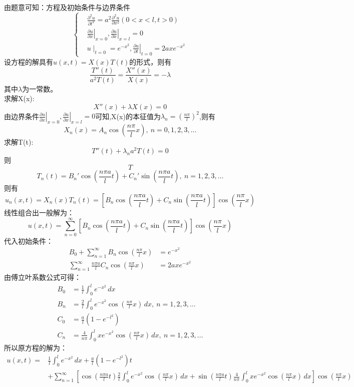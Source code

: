 \documentclass[10.5pt]{article}
\begin{document}
\section{}
由题意可知：方程及初始条件与边界条件$$\left\{\begin{aligned}
    &\frac{\partial^2 u}{\partial t^2}=a^2\frac{\partial^2u}{\partial x^2}(0<x<l,t>0)\\
    &\left.\frac{\partial u}{\partial x}\right\rvert_{x=0},\left.\frac{\partial u}{\partial x}\right\rvert_{x=l}=0\\
    &u\mid_{t=0}=e^{-x^2},\left.\frac{\partial u}{\partial t}\right\rvert_{t=0}=2axe^{-x^2}
\end{aligned}\right.$$\indent
设方程的解具有$u(x,t)=X(x)T(t)$的形式，则有$$\frac{T''(t)}{a^2T(t)}=\frac{X''(x)}{X(x)}=-\lambda$$\indent
其中$\lambda$为一常数。\\\indent
求解X(x):$$X''(x)+\lambda X(x)=0$$\indent
由边界条件$\left.\frac{\partial u}{\partial x}\right\rvert_{x=0},\left.\frac{\partial u}{\partial x}\right\rvert_{x=l}=0$可知,X(x)的本征值为$\lambda_n=\left(\frac{n\pi}{l}\right)^2$,则有$$X_n(x)=A_n\cos\left(\frac{n\pi}{l}x\right),~n=0,1,2,3,\dots$$\indent
求解T(t):$$T''(t)+\lambda_n a^2T(t)=0$$\indent
则$$T$$$$T_n(t)=B_n'\cos\left(\frac{n\pi a}{l}t\right)+C_n'\sin\left(\frac{n\pi a}{l}t\right),~n=1,2,3,\dots$$\indent
则有$$u_n(x,t)=X_n(x)T_n(t)=\left[B_n\cos\left(\frac{n\pi a}{l}t\right)+C_n\sin\left(\frac{n\pi a}{l}t\right)\right]\cos\left(\frac{n\pi}{l}x\right)$$\indent
线性组合出一般解为：$$u(x,t)=\sum_{n=0}^{\infty}\left[B_n\cos\left(\frac{n\pi a}{l}t\right)+C_n\sin\left(\frac{n\pi a}{l}t\right)\right]\cos\left(\frac{n\pi}{l}x\right)$$\indent
代入初始条件：$$\begin{aligned}
    B_0+\sum_{n=1}^{\infty}B_n\cos\left(\frac{n\pi}{l}x\right)&=e^{-x^2}\\
    \sum_{n=1}^{\infty}\frac{n\pi a}{l}C_n\cos\left(\frac{n\pi}{l}x\right)&=2axe^{-x^2}
\end{aligned}$$\indent
由傅立叶系数公式可得：$$\begin{aligned}
    B_0&=\frac{1}{l}\int_0^le^{-x^2}\,dx\\
    B_n&=\frac{2}{l}\int_0^le^{-x^2}\cos\left(\frac{n\pi}{l}x\right)\,dx,~n=1,2,3,\dots\\
    C_0&=\frac{a}{l}\left(1-e^{-l^2}\right)\\
    C_n&=\frac{4}{n\pi}\int_0^lxe^{-x^2}\cos\left(\frac{n\pi}{l}x\right)\,dx,~n=1,2,3,\dots
\end{aligned}$$\indent
所以原方程的解为：$$\begin{aligned}u(x,t)=
    &\frac{1}{l}\int_0^le^{-x^2}\,dx+\frac{a}{l}\left(1-e^{-l^2}\right)t\\
    &+\sum_{n=1}^{\infty}\left[\cos\left(\frac{n\pi a}{l}t\right)\frac{2}{l}\int_0^le^{-x^2}\cos\left(\frac{n\pi}{l}x\right)\,dx+\sin\left(\frac{n\pi a}{l}t\right)\frac{4}{n\pi}\int_0^lxe^{-x^2}\cos\left(\frac{n\pi}{l}x\right)\,dx\right]\cos\left(\frac{n\pi}{l}x\right)\end{aligned}$$\indent
\end{document}
